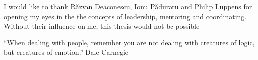 \vspace*{7cm}
\begin{center}
I would like to thank R\u{a}zvan Deaconescu, Ionu P\u{a}duraru and Philip Luppens for opening my eyes in the the concepts of leadership, mentoring and coordinating. Without their influence on me, this thesis would not be possible
\end{center}
\vspace{0.6cm}
\begin{center}
\begin{displayquote}
``When dealing with people, remember you are not dealing with creatures of logic, but creatures of emotion.'' Dale Carnegie
\end{displayquote}
\end{center}
